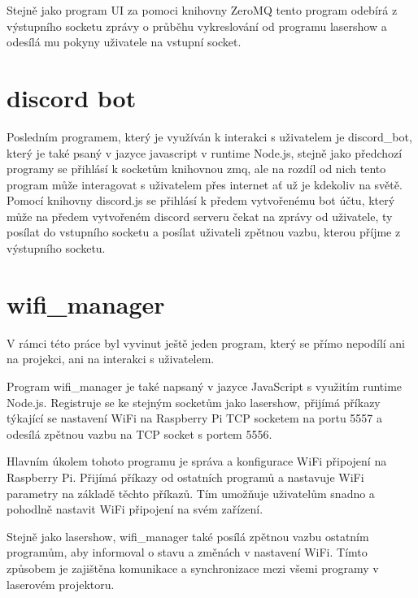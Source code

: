\documentclass{template/socthesis}
\begin{document}


Stejně jako program UI za pomoci knihovny ZeroMQ tento program odebírá z výstupního socketu zprávy o průběhu vykreslování od programu lasershow a odesílá mu pokyny uživatele na vstupní socket.



\section{discord bot}

Posledním programem, který je využíván k interakci s uživatelem je discord\_bot, který je také psaný v jazyce javascript v runtime Node.js, stejně jako předchozí programy se přihlásí k socketům knihovnou zmq, ale na rozdíl od nich tento program může interagovat s uživatelem přes internet ať už je kdekoliv na světě.
Pomocí knihovny discord.js se přihlásí k předem vytvořenému bot účtu, který může na předem vytvořeném discord serveru čekat na zprávy od uživatele, ty posílat do vstupního socketu a posílat uživateli zpětnou vazbu, kterou příjme z výstupního socketu.

\section{wifi\_manager}

V rámci této práce byl vyvinut ještě jeden program, který se přímo nepodílí ani na projekci, ani na interakci s uživatelem.

Program wifi\_manager je také napsaný v jazyce JavaScript s využitím runtime Node.js. Registruje se ke stejným socketům jako lasershow, přijímá příkazy týkající se nastavení WiFi na Raspberry Pi TCP socketem na portu 5557 a odesílá zpětnou vazbu na TCP socket s portem 5556.



Hlavním úkolem tohoto programu je správa a konfigurace WiFi připojení na Raspberry Pi. Přijímá příkazy od ostatních programů a nastavuje WiFi parametry na základě těchto příkazů. Tím umožňuje uživatelům snadno a pohodlně nastavit WiFi připojení na svém zařízení.

Stejně jako lasershow, wifi\_manager také posílá zpětnou vazbu ostatním programům, aby informoval o stavu a změnách v nastavení WiFi. Tímto způsobem je zajištěna komunikace a synchronizace mezi všemi programy v laserovém projektoru.
\end{document}
